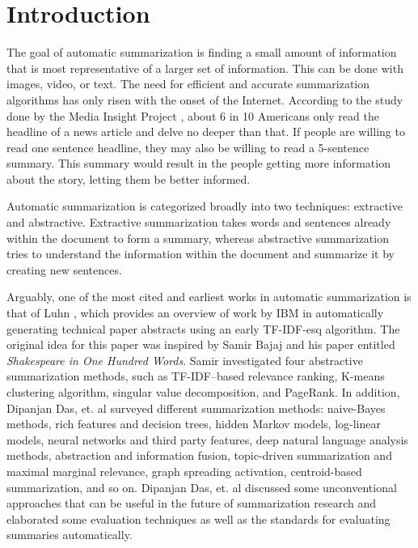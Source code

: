 \documentclass{article}[10]
\begin{document}
\section{Introduction}
The goal of automatic summarization is finding a small amount of information that is most representative of a larger set of information. This can be done with images, video, or text.  The need for efficient and accurate summarization algorithms has only risen with the onset of the Internet. According to the study done by the Media Insight Project  \cite{rosenstiel2014personal}, about 6 in 10 Americans only read the headline of a news article and delve no deeper than that. If people are willing to read one sentence headline, they may also be willing to read a 5-sentence summary. This summary would result in the people getting more information about the story, letting them be better informed.

Automatic summarization is categorized broadly into two techniques: extractive and abstractive. Extractive summarization takes words and sentences already within the document to form a summary, whereas abstractive summarization tries to understand the information within the document and summarize it by creating new sentences.

Arguably, one of the most cited and earliest works in automatic summarization is that of Luhn \cite{luhn1958automatic}, which provides an overview of work by IBM in automatically generating technical paper abstracts using an early TF-IDF-esq algorithm. The original idea for this paper was inspired by Samir Bajaj \cite{bajajshakespeare} and his paper entitled \textit{Shakespeare in One Hundred Words}. Samir investigated four abstractive summarization methods, such as TF-IDF–based relevance ranking, K-means clustering algorithm, singular value decomposition, and PageRank. In addition, Dipanjan Das, et. al  \cite{das2007survey} surveyed different summarization methods: naive-Bayes methods, rich features and decision trees, hidden Markov models, log-linear models,  neural networks and third party features, deep natural language analysis methods, abstraction and information fusion, topic-driven summarization and maximal marginal relevance, graph spreading activation, centroid-based summarization, and so on. Dipanjan Das, et. al discussed some unconventional
approaches that can be useful in the future of summarization research and elaborated some evaluation techniques as well as the standards for evaluating summaries automatically.
\end{document}
